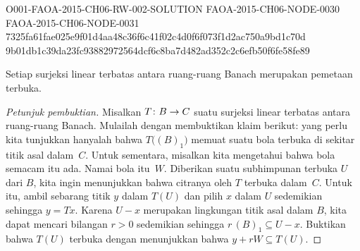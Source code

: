 \begin{o001readerwork}
  {O001-FAOA-2015-CH06-RW-002-SOLUTION}
  {FAOA-2015-CH06-NODE-0030}
  {FAOA-2015-CH06-NODE-0031}
  {7325fa61fae025e9f01d4aa48c36f6c41f02c4d0f6f073f1d2ac750a9bd1c70d}
  {9b01db1c39da23fc93882972564dcf6c8ba7d482ad352c2c6efb50f6fe58fe89}
\begin{o001result}
\begin{thm}\label{C069414} Setiap surjeksi linear terbatas antara
ruang-ruang Banach merupakan pemetaan terbuka.
\end{thm}
\end{o001result}
\begin{o001sourcehint}
\begin{proof}[\emph{Petunjuk pembuktian}] Misalkan $T\colon B \rightarrow C$ suatu surjeksi linear terbatas antara ruang-ruang Banach.
Mulailah dengan membuktikan klaim berikut: yang perlu kita tunjukkan hanyalah bahwa $T\bigl((B)_1\bigr)$ memuat suatu bola terbuka di sekitar
titik asal dalam~$C$.  Untuk sementara, misalkan kita mengetahui bahwa bola semacam itu ada.  Namai bola itu~$W$.  Diberikan suatu subhimpunan terbuka $U$ dari $B$, kita
ingin menunjukkan bahwa citranya oleh $T$ terbuka dalam~$C$.  Untuk itu, ambil sebarang titik $y$ dalam $T(U)$ dan pilih $x$
dalam $U$ sedemikian sehingga $y = Tx$.  Karena $U - x$ merupakan lingkungan titik asal dalam $B$, kita dapat mencari bilangan $r > 0$ sedemikian sehingga
$r\,(B)_1 \subseteq U - x$.  Buktikan bahwa $T(U)$ terbuka dengan menunjukkan bahwa $y + rW \subseteq T(U)$.


\end{proof}
\end{o001sourcehint}
\end{o001readerwork}
